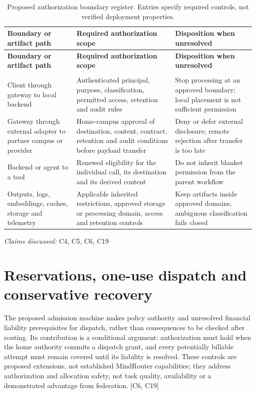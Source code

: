 \documentclass[11pt]{article}
\begin{document}
\begin{longtable}{@{}>{\raggedright\arraybackslash}p{}>{\raggedright\arraybackslash}p{}>{\raggedright\arraybackslash}p{}@{}}
\caption{Proposed authorization boundary register. Entries specify required controls, not verified deployment properties.}\\
\toprule
\textbf{Boundary or artifact path} & \textbf{Required authorization scope} & \textbf{Disposition when unresolved}\\
\midrule
\endfirsthead
\toprule
\textbf{Boundary or artifact path} & \textbf{Required authorization scope} & \textbf{Disposition when unresolved}\\
\midrule
\endhead
\midrule
\multicolumn{3}{r}{\footnotesize Continued on next page}\\
\endfoot
\bottomrule
\endlastfoot
Client through gateway to local backend & Authenticated principal, purpose, classification, permitted access, retention and audit rules & Stop processing at an approved boundary; local placement is not sufficient permission\\
Gateway through external adapter to partner campus or provider & Home-campus approval of destination, content, contract, retention and audit conditions before payload transfer & Deny or defer external disclosure; remote rejection after transfer is too late\\
Backend or agent to a tool & Renewed eligibility for the individual call, its destination and its derived content & Do not inherit blanket permission from the parent workflow\\
Outputs, logs, embeddings, caches, storage and telemetry & Applicable inherited restrictions, approved storage or processing domain, access and retention controls & Keep artifacts inside approved domains; ambiguous classification fails closed\\
\end{longtable}
\par{}
\textit{Claims discussed: }C4, C5, C6, C19
\section{Reservations, one-use dispatch and conservative recovery}
The proposed admission machine makes policy authority and unresolved financial liability prerequisites for dispatch, rather than consequences to be checked after routing. Its contribution is a conditional argument: authorization must hold when the home authority commits a dispatch grant, and every potentially billable attempt must remain covered until its liability is resolved. These controls are proposed extensions, not established MindRouter capabilities; they address authorization and allocation safety, not task quality, availability or a demonstrated advantage from federation. [C6, C19]
\end{document}
